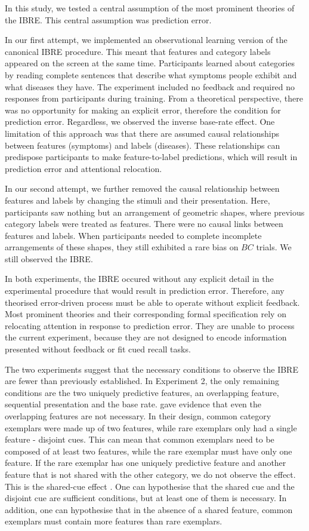 \documentclass[10pt,letterpaper]{article}
\begin{document}
In this study, we tested a central assumption of the most prominent theories of the IBRE.
This central assumption was prediction error.

In our first attempt, we implemented an observational learning version of the canonical IBRE procedure.
This meant that features and category labels appeared on the screen at the same time.
Participants learned about categories by reading complete sentences that describe what symptoms people exhibit and what diseases they have.
The experiment included no feedback and required no responses from participants during training.
From a theoretical perspective, there was no opportunity for making an explicit error, therefore the condition for prediction error.
Regardless, we observed the inverse base-rate effect.
One limitation of this approach was that there are assumed causal relationships between features (symptoms) and labels (diseases).
These relationships can predispose participants to make feature-to-label predictions, which will result in prediction error and attentional relocation.

In our second attempt, we further removed the causal relationship between features and labels by changing the stimuli and their presentation.
Here, participants saw nothing but an arrangement of geometric shapes, where previous category labels were treated as features.
There were no causal links between features and labels.
When participants needed to complete incomplete arrangements of these shapes, they still exhibited a rare bias on $BC$ trials.
We still observed the IBRE.

In both experiments, the IBRE occured without any explicit detail in the experimental procedure that would result in prediction error.
Therefore, any theorised error-driven process must be able to operate without explicit feedback.
Most prominent theories and their corresponding formal specification rely on relocating attention in response to prediction error.
They are unable to process the current experiment, because they are not designed to encode information presented without feedback or fit cued recall tasks.

The two experiments suggest that the necessary conditions to observe the IBRE are fewer than previously established.
In Experiment 2, the only remaining conditions are the two uniquely predictive features, an overlapping feature, sequential presentation and the base rate.
\cite{johansen2007paradoxical} gave evidence that even the overlapping features are not necessary.
In their design, common category exemplars were made up of two features, while rare exemplars only had a single feature - disjoint cues.
This can mean that common exemplars need to be composed of at least two features, while the rare exemplar must have only one feature.
If the rare exemplar has one uniquely predictive feature and another feature that is not shared with the other category, we do not observe the effect.
This is the shared-cue effect \cite{kruschke2001inverse, wills2014attention}.
One can hypothesise that the shared cue and the disjoint cue are sufficient conditions, but at least one of them is necessary.
In addition, one can hypothesise that in the absence of a shared feature, common exemplars must contain more features than rare exemplars.
\end{document}
